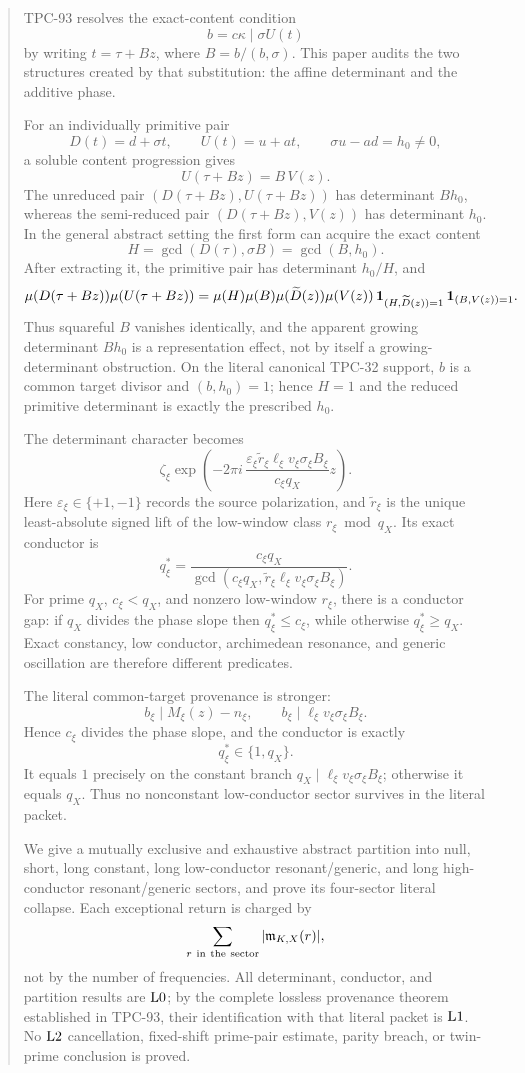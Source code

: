 \begin{abstract}
TPC-93 resolves the exact-content condition
\[
 b=c\kappa\mid \sigma U(t)
\]
by writing \(t=\tau+Bz\), where
\(B=b/(b,\sigma)\).  This paper audits the two structures created by
that substitution: the affine determinant and the additive phase.

For an individually primitive pair
\[
 D(t)=d+\sigma t,\qquad U(t)=u+at,\qquad
 \sigma u-ad=h_0\ne0,
\]
a soluble content progression gives
\[
 U(\tau+Bz)=B\,V(z).
\]
The unreduced pair \((D(\tau+Bz),U(\tau+Bz))\) has determinant
\(Bh_0\), whereas the semi-reduced pair
\((D(\tau+Bz),V(z))\) has determinant \(h_0\).  In the general
abstract setting the first form can acquire the exact content
\[
 H=\gcd(D(\tau),\sigma B)=\gcd(B,h_0).
\]
After extracting it, the primitive pair has determinant \(h_0/H\),
and
\[
\mu(D(\tau+Bz))\mu(U(\tau+Bz))
=
\mu(H)\mu(B)\mu(\widetilde D(z))\mu(V(z))
\,\one_{(H,\widetilde D(z))=1}
\,\one_{(B,V(z))=1}.
\]
Thus squareful \(B\) vanishes identically, and the apparent
growing determinant \(Bh_0\) is a representation effect, not by
itself a growing-determinant obstruction.  On the literal canonical
TPC-32 support, \(b\) is a common target divisor and
\((b,h_0)=1\); hence \(H=1\) and the reduced primitive determinant is
exactly the prescribed \(h_0\).

The determinant character becomes
\[
 \zeta_{\xi}\exp\!\left(
 -2\pi i\,\frac{\varepsilon_\xi\widetilde r_\xi\ell_\xi v_\xi
 \sigma_\xi B_\xi}{c_\xi q_X}z\right).
\]
Here \(\varepsilon_\xi\in\{+1,-1\}\) records the source
polarization, and \(\widetilde r_\xi\) is the unique least-absolute
signed lift of the low-window class \(r_\xi\bmod q_X\).
Its exact conductor is
\[
 q_\xi^\ast
 =
 \frac{c_\xi q_X}
 {\gcd(c_\xi q_X,
 \widetilde r_\xi\ell_\xi v_\xi\sigma_\xi B_\xi)}.
\]
For prime \(q_X\), \(c_\xi<q_X\), and nonzero low-window
\(r_\xi\), there is a conductor gap: if \(q_X\) divides the phase
slope then \(q_\xi^\ast\le c_\xi\), while otherwise
\(q_\xi^\ast\ge q_X\).  Exact constancy, low conductor,
archimedean resonance, and generic oscillation are therefore
different predicates.

The literal common-target provenance is stronger:
\[
 b_\xi\mid M_\xi(z)-n_\xi,\qquad
 b_\xi\mid\ell_\xi v_\xi\sigma_\xi B_\xi.
\]
Hence \(c_\xi\) divides the phase slope, and the conductor is exactly
\[
 q_\xi^\ast\in\{1,q_X\}.
\]
It equals \(1\) precisely on the constant branch
\(q_X\mid\ell_\xi v_\xi\sigma_\xi B_\xi\); otherwise it equals
\(q_X\).  Thus no nonconstant low-conductor sector survives in the
literal packet.

We give a mutually exclusive and exhaustive abstract partition into
null, short, long constant, long low-conductor resonant/generic, and
long high-conductor resonant/generic sectors, and prove its
four-sector literal collapse.  Each exceptional return is charged by
\[
 \sum_{r\ {\rm in\ the\ sector}}
 |\mathfrak m_{K,X}(r)|,
\]
not by the number of frequencies.  All determinant, conductor, and
partition results are \(\Lzero\); by the complete
lossless provenance theorem established in TPC-93, their identification
with that literal packet is \(\Lone\).  No \(\Ltwo\) cancellation,
fixed-shift prime-pair estimate, parity breach, or twin-prime
conclusion is proved.
\end{abstract}
